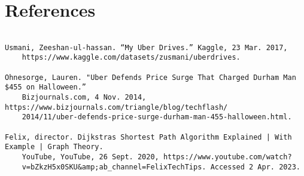 \documentclass[fontsize=11pt]{article}
\begin{document}
\section*{References}
\begin{verbatim}

Usmani, Zeeshan-ul-hassan. “My Uber Drives.” Kaggle, 23 Mar. 2017,
    https://www.kaggle.com/datasets/zusmani/uberdrives. 

Ohnesorge, Lauren. "Uber Defends Price Surge That Charged Durham Man $455 on Halloween.” 
    Bizjournals.com, 4 Nov. 2014, https://www.bizjournals.com/triangle/blog/techflash/
    2014/11/uber-defends-price-surge-durham-man-455-halloween.html. 

Felix, director. Dijkstras Shortest Path Algorithm Explained | With Example | Graph Theory. 
    YouTube, YouTube, 26 Sept. 2020, https://www.youtube.com/watch? 
    v=bZkzH5x0SKU&amp;ab_channel=FelixTechTips. Accessed 2 Apr. 2023. 



\end{verbatim}
\end{document}
